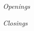 \documentclass{article}
\begin{document}
\textit{Openings}

\begin{multicols}{3}[]
\end{multicols}

\textit{Closings}

\begin{multicols}{3}[]
\end{multicols}
\end{document}
